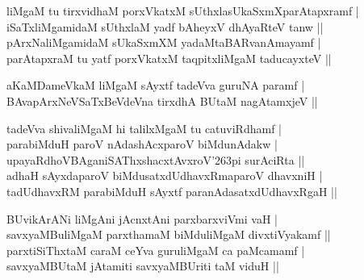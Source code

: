 \begin{entry}
\medskip
{}
\smallskip
\begin{shl}
liMgaM tu tirxvidhaM porxVkatxM sUthxlasUkaSxmXparAtapxramf |\\
iSaTxliMgamidaM sUthxlaM yadf bAheyxV dhAyaRteV tanw ||\\
pArxNaliMgamidaM sUkaSxmXM yadaMtaBARvanAmayamf |\\
parAtapxraM tu yatf porxVkatxM taqpitxliMgaM taducayxteV ||
\end{shl}
\medskip
{}
\smallskip
\begin{shl}
aKaMDameVkaM liMgaM sAyxtf tadeVva guruNA paramf |\\
BAvapArxNeVSaTxBeVdeVna tirxdhA BUtaM nagAtamxjeV ||
\end{shl}
\medskip
{}
\smallskip
\begin{shl}
tadeVva shivaliMgaM hi talilxMgaM tu catuviRdhamf |\\
parabiMduH paroV nAdashAcxparoV biMdunAdakw |\\
upayaRdhoVBAganiSAThxshacxtAvxroV{\char'263}pi surAciRta ||\\
adhaH sAyxdaparoV biMdusatxdUdhavxRmaparoV dhavxniH |\\
tadUdhavxRM parabiMduH sAyxtf paranAdasatxdUdhavxRgaH ||
\end{shl}
\medskip
{}
\smallskip
\begin{shl}
BUvikArANi liMgAni jAcnxtAni parxbarxviVmi vaH |\\
savxyaMBuliMgaM parxthamaM biMduliMgaM divxtiVyakamf ||\\
parxtiSiThxtaM caraM ceYva guruliMgaM ca paMcamamf |\\
savxyaMBUtaM jAtamiti savxyaMBUriti taM viduH ||\\

\end{shl}
\end{entry}
